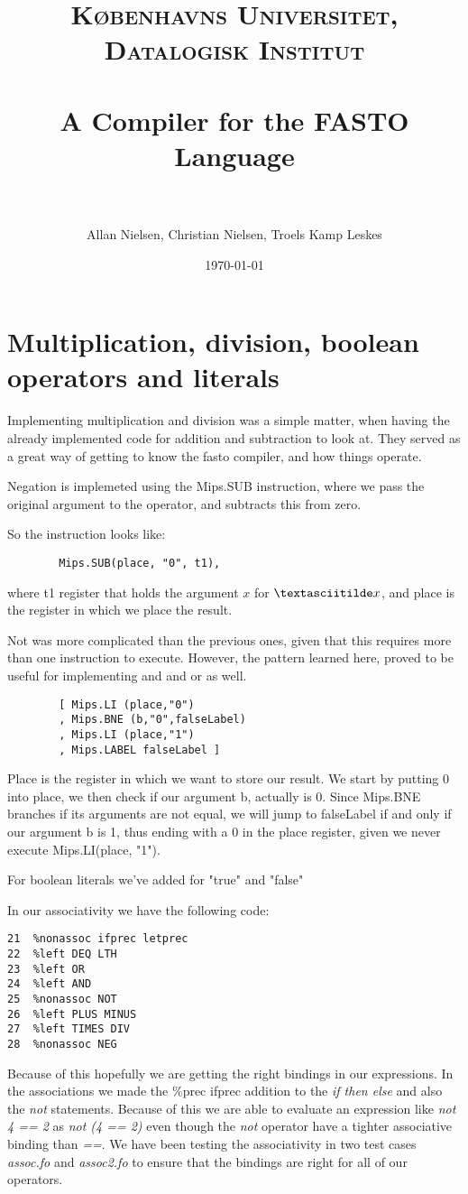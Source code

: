 \documentclass[paper=a4, fontsize=11pt]{scrartcl} %
\title{	
\normalfont \normalsize 
\textsc{Københavns Universitet, Datalogisk Institut} \\ [25pt] %
\horrule{0.5pt} \\[0.4cm] %
\huge A Compiler for the FASTO Language\\ %
\horrule{2pt} \\[0.5cm] %
}
\author{Allan Nielsen, Christian Nielsen, Troels Kamp Leskes} %
\date{\normalsize\today} %
\numberwithin{equation}{section} %
\numberwithin{figure}{section} %
\numberwithin{table}{section} %
\begin{document}
\maketitle %
\tableofcontents

\pagebreak


\section{Multiplication, division, boolean operators and literals}

	Implementing multiplication and division was a simple matter, when having the already implemented code for addition and subtraction to look at. They served as a great way of getting to know the fasto compiler, and how things operate.
	
	Negation is implemeted using the Mips.SUB instruction, where we pass the original argument to the operator, and subtracts this from zero.

	So the instruction looks like:
	\begin{verbatim}
		Mips.SUB(place, "0", t1),
	\end{verbatim}

	where t1 register that holds the argument $x$ for $\textasciitilde x$, and place is the register in which we place the result.

	Not was more complicated than the previous ones, given that this requires more than one instruction to execute. However, the pattern learned here, proved to be useful for implementing and and or as well.

	\begin{verbatim}
		[ Mips.LI (place,"0")
		, Mips.BNE (b,"0",falseLabel)
		, Mips.LI (place,"1")
		, Mips.LABEL falseLabel ]
    \end{verbatim}
    
    Place is the register in which we want to store our result. We start by putting 0 into place, we then check if our argument b, actually is 0. Since Mips.BNE branches if its arguments are not equal, we will jump to falseLabel if and only if our argument b is 1, thus ending with a 0 in the place register, given we never execute Mips.LI(place, "1").
    
For boolean literals we've added for "true" and "false"
 
In our associativity we have the following code:

\begin{lstlisting}
21  %nonassoc ifprec letprec
22  %left DEQ LTH
23  %left OR 
24  %left AND
25  %nonassoc NOT
26  %left PLUS MINUS
27  %left TIMES DIV
28  %nonassoc NEG
\end{lstlisting}
Because of this hopefully we are getting the right bindings in our expressions. In the associations we made the \%prec ifprec addition to the \textit{if then else} and also the \textit{not} statements. Because of this we are able to evaluate an expression like \textit{not 4 == 2} as \textit{not (4 == 2)} even though the \textit{not} operator have a tighter associative binding than \textit{==}. We have been testing the associativity in two test cases \textit{assoc.fo} and \textit{assoc2.fo} to ensure that the bindings are right for all of our operators.   
 
\end{document}
